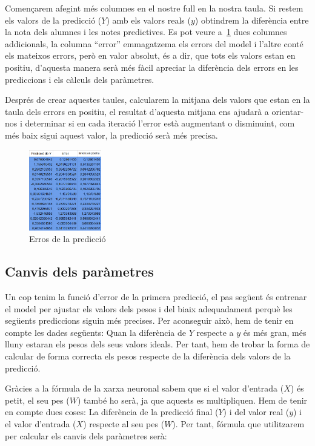 Començarem afegint més columnes en el nostre full en la nostra taula. Si restem els valors de la predicció ($Y$) amb els valors reals ($y$) obtindrem la diferència entre la nota dels alumnes i les notes predictives.
\clearpage
Es pot veure a~\ref{f:errors} dues columnes addicionals, la columna ``error'' emmagatzema els errors del model i l'altre conté els mateixos errors, però en valor absolut, és a dir, que tots els valors estan en positiu, d'aquesta manera serà més fàcil apreciar la diferència dels errors en les prediccions i els càlculs dels paràmetres.

Després de crear aquestes taules, calcularem la mitjana dels valors que estan en la taula dels errors en positiu, el resultat d'aquesta mitjana ens ajudarà a orientar-nos i determinar si en cada iteració l'error està augmentant o disminuint, com més baix sigui aquest valor, la predicció serà més precisa.

\begin{figure}[h!]
    \centering
    \includegraphics[width=0.28\textwidth]{./figures/Errors.png}
    \caption{Erros de la predicció}
    \label{f:errors}
\end{figure}

\subsection{Canvis dels paràmetres}
Un cop tenim la funció d'error de la primera predicció, el pas següent és entrenar el model per ajustar els valors dels pesos i del biaix adequadament perquè les següents prediccions siguin més precises.
Per aconseguir això, hem de tenir en compte les dades següents: Quan la diferència de $Y$ respecte a $y$ és més gran, més lluny estaran els pesos dels seus valors ideals. Per tant, hem de trobar la forma de calcular de forma correcta els pesos respecte de la diferència dels valors de la predicció.

Gràcies a la fórmula de la xarxa neuronal sabem que si el valor d'entrada ($X$) és petit, el seu pes ($W$) també ho serà, ja que aquests es multipliquen. Hem de tenir en compte dues coses: La diferència de la predicció final ($Y$) i del valor real ($y$) i el valor d'entrada ($X$) respecte al seu pes ($W$). Per tant, fórmula que utilitzarem per calcular els canvis dels paràmetres serà:

